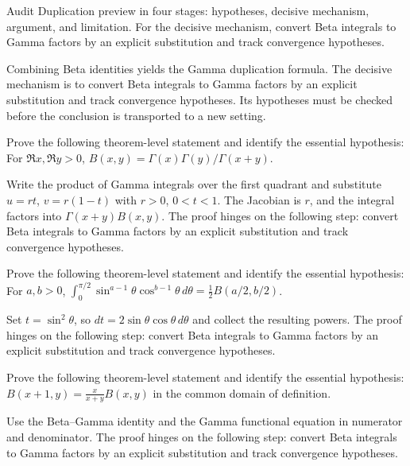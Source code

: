 \begin{problem}\label{prob:iv20-problem-08}
Audit Duplication preview in four stages: hypotheses, decisive mechanism, argument, and limitation. For the decisive mechanism, convert Beta integrals to Gamma factors by an explicit substitution and track convergence hypotheses.
\end{problem}
\begin{solution}
Combining Beta identities yields the Gamma duplication formula. The decisive mechanism is to convert Beta integrals to Gamma factors by an explicit substitution and track convergence hypotheses. Its hypotheses must be checked before the conclusion is transported to a new setting.
\end{solution}

\begin{problem}\label{prob:iv20-problem-09}
Prove the following theorem-level statement and identify the essential hypothesis: For $\Re x,\Re y>0$, $B(x,y)=\Gamma(x)\Gamma(y)/\Gamma(x+y)$.
\end{problem}
\begin{solution}
Write the product of Gamma integrals over the first quadrant and substitute $u=r t$, $v=r(1-t)$ with $r>0$, $0<t<1$. The Jacobian is $r$, and the integral factors into $\Gamma(x+y)B(x,y)$. The proof hinges on the following step: convert Beta integrals to Gamma factors by an explicit substitution and track convergence hypotheses.
\end{solution}

\begin{problem}\label{prob:iv20-problem-10}
Prove the following theorem-level statement and identify the essential hypothesis: For $a,b>0$, $\int_0^{\pi/2}\sin^{a-1}\theta\cos^{b-1}\theta\,d\theta=\frac12B(a/2,b/2)$.
\end{problem}
\begin{solution}
Set $t=\sin^2\theta$, so $dt=2\sin\theta\cos\theta\,d\theta$ and collect the resulting powers. The proof hinges on the following step: convert Beta integrals to Gamma factors by an explicit substitution and track convergence hypotheses.
\end{solution}

\begin{problem}\label{prob:iv20-problem-11}
Prove the following theorem-level statement and identify the essential hypothesis: $B(x+1,y)=\frac{x}{x+y}B(x,y)$ in the common domain of definition.
\end{problem}
\begin{solution}
Use the Beta--Gamma identity and the Gamma functional equation in numerator and denominator. The proof hinges on the following step: convert Beta integrals to Gamma factors by an explicit substitution and track convergence hypotheses.
\end{solution}

